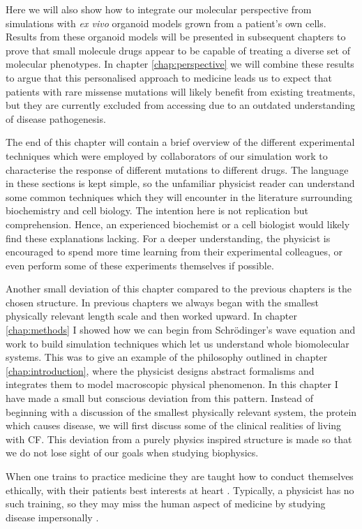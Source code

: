 Here we will also show how to integrate our molecular perspective from simulations with \textit {ex vivo} organoid models grown from a patient's own cells. Results from these organoid models will be presented in subsequent chapters to prove that small molecule drugs appear to be capable of treating a diverse set of molecular phenotypes. In chapter \ref{chap:perspective} we will combine these results to argue that this personalised approach to medicine leads us to expect that patients with rare missense mutations will likely benefit from existing treatments, but they are currently excluded from accessing due to an outdated understanding of disease pathogenesis. 

The end of this chapter will contain a brief overview of the different experimental techniques which were employed by collaborators of our simulation work to characterise the response of different mutations to different drugs. The language in these sections is kept simple, so the unfamiliar physicist reader can understand some common techniques which they will encounter in the literature surrounding biochemistry and cell biology. The intention here is not replication but comprehension. Hence, an experienced biochemist or a cell biologist would likely find these explanations lacking. For a deeper understanding, the physicist is encouraged to spend more time learning from their experimental colleagues, or even perform some of these experiments themselves if possible. 

Another small deviation of this chapter compared to the previous chapters is the chosen structure. In previous chapters we always began with the smallest physically relevant length scale and then worked upward. In chapter \ref{chap:methods} I showed how we can begin from Schr\"odinger's wave equation and work to build simulation techniques which let us understand whole biomolecular systems. This was to give an example of the philosophy outlined in chapter \ref{chap:introduction}, where the physicist designs abstract formalisms and integrates them to model macroscopic physical phenomenon. In this chapter I have made a small but conscious deviation from this pattern. Instead of beginning with a discussion of the smallest physically relevant system, the protein which causes disease, we will first discuss some of the clinical realities of living with CF. This deviation from a purely physics inspired structure is made so that we do not lose sight of our goals when studying biophysics.

When one trains to practice medicine they are taught how to conduct themselves ethically, with their patients best interests at heart \cite{hajar2017}. Typically, a physicist has no such training, so they may miss the human aspect of medicine by studying disease impersonally \cite{foucault1994}. 

